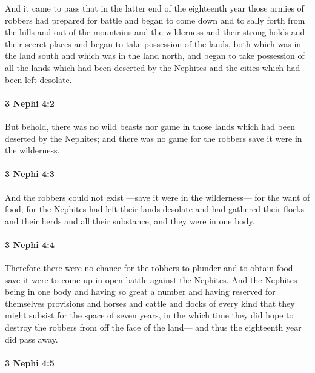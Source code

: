 			And it came to pass that in the latter end of the eighteenth year
			those armies of robbers had prepared for battle
			and began to come down and to sally forth from the hills
			and out of the mountains and the wilderness
			and their strong holds and their secret places
			and began to take possession of the lands,
			both which was in the land south and which was in the land north,
			and began to take possession of all the lands
			which had been deserted by the Nephites
			and the cities which had been left desolate.

		\paragraph{3 Nephi 4:2} %
			\label{3NEPHI-4-2}

			But behold, there was no wild beasts nor game in those lands
			which had been deserted by the Nephites;
			and there was no game for the robbers save it were in the wilderness.

		\paragraph{3 Nephi 4:3} %
			\label{3NEPHI-4-3}

			And the robbers could not exist
			---save it were in the wilderness---
			for the want of food;
			for the Nephites had left their lands desolate
			and had gathered their flocks and their herds and all their substance,
			and they were in one body.

		\paragraph{3 Nephi 4:4} %
			\label{3NEPHI-4-4}

			Therefore there were no chance for the robbers to plunder and to obtain food
			save it were to come up in open battle against the Nephites.
			And the Nephites being in one body
			and having so great a number
			and having reserved for themselves provisions
			and horses and cattle and flocks of every kind
			that they might subsist for the space of seven years,
			in the which time they did hope
			to destroy the robbers from off the face of the land---
			and thus the eighteenth year did pass away.

		\paragraph{3 Nephi 4:5} %
			\label{3NEPHI-4-5}


